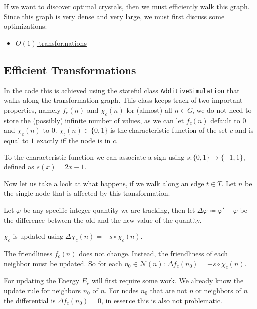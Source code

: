 \documentclass[
]{article}
\providecommand{\tightlist}{%
  \setlength{\itemsep}{0pt}\setlength{\parskip}{0pt}}
\begin{document}
If we want to discover optimal crystals, then we must efficiently walk
this graph. Since this graph is very dense and very large, we must first
discuss some optimizations:

\begin{itemize}
\tightlist
\item
  \protect\hyperlink{efficient-transformations}{\(O(1)\)
  transformations}
\end{itemize}

\hypertarget{efficient-transformations}{%
\subsection{Efficient Transformations}\label{efficient-transformations}}

In the code this is achieved using the stateful class
\texttt{AdditiveSimulation} that walks along the transformation graph.
This class keeps track of two important properties, namely \(f_c(n)\)
and \(\chi_c(n)\) for (almost) all \(n \in G\), we do not need to store
the (possibly) infinite number of values, as we can let \(f_c(n)\)
default to \(0\) and \(\chi_c(n)\) to \(0\). \(\chi_c(n) \in \{0,1\}\)
is the characteristic function of the set \(c\) and is equal to \(1\)
exactly iff the node is in \(c\).

To the characteristic function we can associate a sign using
\(s: \{0,1\} \rightarrow \{-1, 1\}\), defined as \(s(x) = 2x - 1\).

Now let us take a look at what happens, if we walk along an edge
\(t \in T\). Let \(n\) be the single node that is affected by this
transformation.

Let \(\varphi\) be any specific integer quantity we are tracking, then
let \(\Delta\varphi \coloneq \varphi' - \varphi\) be the difference
between the old and the new value of the quantity.

\(\chi_c\) is updated using \(\Delta\chi_c(n) = -s\circ\chi_c(n)\).

The friendliness \(f_c(n)\) does not change. Instead, the friendliness
of each neighbor must be updated. So for each
\(n_0 \in \mathcal{N}(n)\): \(\Delta f_c(n_0) = -s\circ\chi_c(n)\).

For updating the Energy \(E_c\) will first require some work. We already
know the update rule for neighbors \(n_0\) of \(n\). For nodes \(n_0\)
that are not \(n\) or neighbors of \(n\) the differential is
\(\Delta f_c(n_0) = 0\), in essence this is also not problematic.
\end{document}
